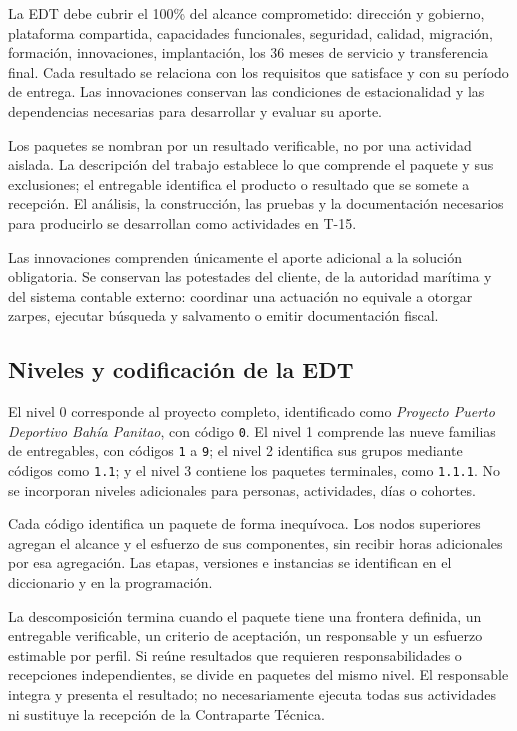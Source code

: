 La EDT debe cubrir el 100\% del alcance comprometido: dirección y gobierno, plataforma compartida, capacidades funcionales, seguridad, calidad, migración, formación, innovaciones, implantación, los 36 meses de servicio y transferencia final. Cada resultado se relaciona con los requisitos que satisface y con su período de entrega. Las innovaciones conservan las condiciones de estacionalidad y las dependencias necesarias para desarrollar y evaluar su aporte.

Los paquetes se nombran por un resultado verificable, no por una actividad aislada. La descripción del trabajo establece lo que comprende el paquete y sus exclusiones; el entregable identifica el producto o resultado que se somete a recepción. El análisis, la construcción, las pruebas y la documentación necesarios para producirlo se desarrollan como actividades en T-15.

Las innovaciones comprenden únicamente el aporte adicional a la solución obligatoria. Se conservan las potestades del cliente, de la autoridad marítima y del sistema contable externo: coordinar una actuación no equivale a otorgar zarpes, ejecutar búsqueda y salvamento o emitir documentación fiscal.

\subsection{Niveles y codificación de la EDT}

El nivel 0 corresponde al proyecto completo, identificado como \emph{Proyecto Puerto Deportivo Bahía Panitao}, con código \texttt{0}. El nivel 1 comprende las nueve familias de entregables, con códigos \texttt{1} a \texttt{9}; el nivel 2 identifica sus grupos mediante códigos como \texttt{1.1}; y el nivel 3 contiene los paquetes terminales, como \texttt{1.1.1}. No se incorporan niveles adicionales para personas, actividades, días o cohortes.

Cada código identifica un paquete de forma inequívoca. Los nodos superiores agregan el alcance y el esfuerzo de sus componentes, sin recibir horas adicionales por esa agregación. Las etapas, versiones e instancias se identifican en el diccionario y en la programación.

La descomposición termina cuando el paquete tiene una frontera definida, un entregable verificable, un criterio de aceptación, un responsable y un esfuerzo estimable por perfil. Si reúne resultados que requieren responsabilidades o recepciones independientes, se divide en paquetes del mismo nivel. El responsable integra y presenta el resultado; no necesariamente ejecuta todas sus actividades ni sustituye la recepción de la Contraparte Técnica.

